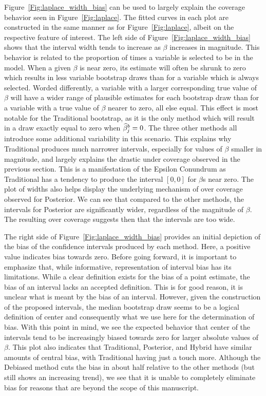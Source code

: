Figure~\ref{Fig:laplace_width_bias} can be used to largely explain the coverage behavior seen in Figure~\ref{Fig:laplace}. The fitted curves in each plot are constructed in the same manner as for Figure~\ref{Fig:laplace}, albeit on the respective feature of interest. The left side of Figure~\ref{Fig:laplace_width_bias} shows that the interval width tends to increase as $\beta$ increases in magnitude. This behavior is related to the proportion of times a variable is selected to be in the model. When a given $\beta$ is near zero, its estimate will often be shrunk to zero which results in less variable bootstrap draws than for a variable which is always selected. Worded differently, a variable with a larger corresponding true value of $\beta$ will have a wider range of plausible estimates for each bootstrap draw than for a variable with a true value of $\beta$ nearer to zero, all else equal. This effect is most notable for the Traditional bootstrap, as it is the only method which will result in a draw exactly equal to zero when $\widehat{\beta}^b_j = 0$. The three other methods all introduce some additional variability in this scenario. This explains why Traditional produces much narrower intervals, especially for values of $\beta$ smaller in magnitude, and largely explains the drastic under coverage observed in the previous section. This is a manifestation of the Epsilon Conundrum as Traditional has a tendency to produce the interval $[0,0]$ for $\beta$s near zero. The plot of widths also helps display the underlying mechanism of over coverage observed for Posterior. We can see that compared to the other methods, the intervals for Posterior are significantly wider, regardless of the magnitude of $\beta$. The resulting over coverage suggests then that the intervals are too wide.

The right side of Figure~\ref{Fig:laplace_width_bias} provides an initial depiction of the bias of the confidence intervals produced by each method. Here, a positive value indicates bias towards zero. Before going forward, it is important to emphasize that, while informative, representation of interval bias has its limitations. While a clear definition exists for the bias of a point estimate, the bias of an interval lacks an accepted definition. This is for good reason, it is unclear what is meant by the bias of an interval. However, given the construction of the proposed intervals, the median bootstrap draw seems to be a logical definition of center and consequently what we use here for the determination of bias. With this point in mind, we see the expected behavior that center of the intervals tend to be increasingly biased towards zero for larger absolute values of $\beta$. This plot also indicates that Traditional, Posterior, and Hybrid have similar amounts of central bias, with Traditional having just a touch more. Although the Debiased method cuts the bias in about half relative to the other methods (but still shows an increasing trend), we see that it is unable to completely eliminate bias for reasons that are beyond the scope of this manuscript.

